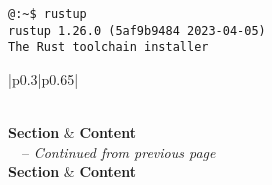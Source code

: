 \begin{lstlisting}[style=zsh]
@:~$ rustup
rustup 1.26.0 (5af9b9484 2023-04-05)
The Rust toolchain installer
\end{lstlisting}
\begin{longtable}{|p{0.3\linewidth}|p{0.65\linewidth}|}
	\caption{Rustup 1.26.0 Command-Line Interface Documentation} \\
	\hline
	\textbf{Section} & \textbf{Content} \\
	\hline
	\endfirsthead
	{\tablename\ \thetable\ -- \textit{Continued from previous page}} \\
	\hline
	\textbf{Section} & \textbf{Content} \\
	\hline
	\endhead
	\hline {} \\
	\endfoot
	\hline
	\endlastfoot
	

\end{longtable}
